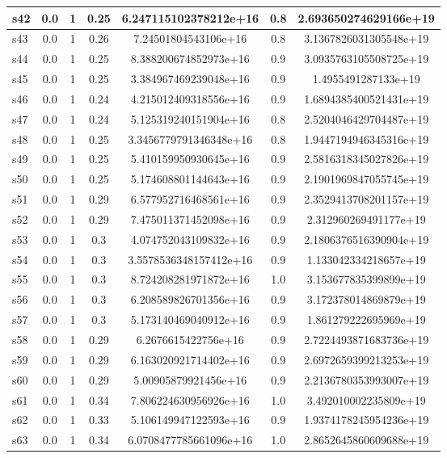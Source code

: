 \documentclass{article}
\begin{document}
\begin{tabular}{|l|c|c|c|c|c|c|}
s42 &0.0 & 1 & 0.25 & 6.247115102378212e+16 & 0.8 & 2.693650274629166e+19\\
\hline
s43 &0.0 & 1 & 0.26 & 7.24501804543106e+16 & 0.8 & 3.1367826031305548e+19\\
\hline
s44 &0.0 & 1 & 0.25 & 8.388200674852973e+16 & 0.9 & 3.0935763105508725e+19\\
\hline
s45 &0.0 & 1 & 0.25 & 3.384967469239048e+16 & 0.9 & 1.4955491287133e+19\\
\hline
s46 &0.0 & 1 & 0.24 & 4.215012409318556e+16 & 0.9 & 1.6894385400521431e+19\\
\hline
s47 &0.0 & 1 & 0.24 & 5.125319240151904e+16 & 0.8 & 2.5204046429704487e+19\\
\hline
s48 &0.0 & 1 & 0.25 & 3.3456779791346348e+16 & 0.8 & 1.9447194946345316e+19\\
\hline
s49 &0.0 & 1 & 0.25 & 5.410159950930645e+16 & 0.9 & 2.5816318345027826e+19\\
\hline
s50 &0.0 & 1 & 0.25 & 5.174608801144643e+16 & 0.9 & 2.1901969847055745e+19\\
\hline
s51 &0.0 & 1 & 0.29 & 6.577952716468561e+16 & 0.9 & 2.3529413708201157e+19\\
\hline
s52 &0.0 & 1 & 0.29 & 7.475011371452098e+16 & 0.9 & 2.312960269491177e+19\\
\hline
s53 &0.0 & 1 & 0.3 & 4.074752043109832e+16 & 0.9 & 2.1806376516390904e+19\\
\hline
s54 &0.0 & 1 & 0.3 & 3.5578536348157412e+16 & 0.9 & 1.133042334218657e+19\\
\hline
s55 &0.0 & 1 & 0.3 & 8.724208281971872e+16 & 1.0 & 3.153677835399899e+19\\
\hline
s56 &0.0 & 1 & 0.3 & 6.208589826701356e+16 & 0.9 & 3.172378014869879e+19\\
\hline
s57 &0.0 & 1 & 0.3 & 5.173140469040912e+16 & 0.9 & 1.861279222695969e+19\\
\hline
s58 &0.0 & 1 & 0.29 & 6.2676615422756e+16 & 0.9 & 2.7224493871683736e+19\\
\hline
s59 &0.0 & 1 & 0.29 & 6.163020921714402e+16 & 0.9 & 2.6972659399213253e+19\\
\hline
s60 &0.0 & 1 & 0.29 & 5.00905879921456e+16 & 0.9 & 2.2136780353993007e+19\\
\hline
s61 &0.0 & 1 & 0.34 & 7.806224630956926e+16 & 1.0 & 3.492010002235809e+19\\
\hline
s62 &0.0 & 1 & 0.33 & 5.106149947122593e+16 & 0.9 & 1.9374178245954236e+19\\
\hline
s63 &0.0 & 1 & 0.34 & 6.0708477785661096e+16 & 1.0 & 2.8652645860609688e+19\\

\end{tabular}
\end{document}
